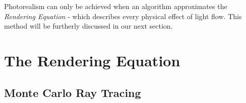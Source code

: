 Photorealism can only be achieved when an algorithm approximates the \textit{Rendering Equation} - which describes every physical effect of light flow. This method will be furtherly discussed in our next section. 

\section{The Rendering Equation}


\subsection{Monte Carlo Ray Tracing}


